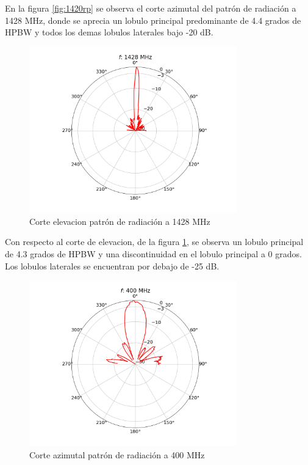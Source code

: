 En la figura \ref{fig:1420rp} se observa el corte azimutal del patrón de radiación a 1428 MHz, donde se aprecia un lobulo principal predominante de 4.4 grados de HPBW y todos los demas lobulos laterales bajo -20 dB.\\

\begin{figure}
    \centering
    \includegraphics[width=0.8\textwidth]{img/1420rpel}
    \caption{Corte elevacion patrón de radiación a 1428 MHz}
    \label{fig:1420rpel}
\end{figure}

Con respecto al corte de elevacion, de la figura \ref{fig:1420rpel}, se observa un lobulo principal de 4.3 grados de HPBW y una discontinuidad en el lobulo principal a 0 grados. Los lobulos laterales  se encuentran por debajo de -25 dB.\\

\begin{figure}
    \centering
    \includegraphics[width=0.8\textwidth]{img/400rp}
    \caption{Corte azimutal patrón de radiación a 400 MHz}
    \label{fig:400rp}
\end{figure}

